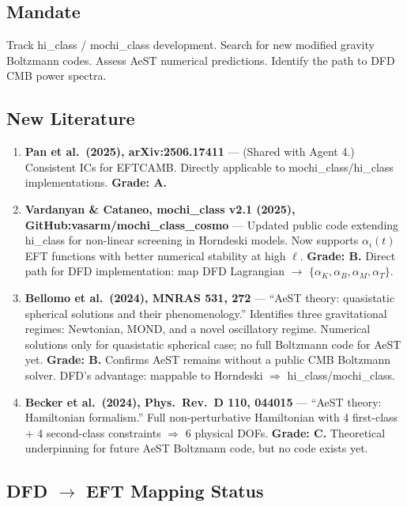 \documentclass[11pt,a4paper]{article}
\begin{document}
\subsection{Mandate}
Track hi\_class / mochi\_class development. Search for new modified gravity Boltzmann codes. Assess AeST numerical predictions. Identify the path to DFD CMB power spectra.

\subsection{New Literature}

\begin{enumerate}

\item \textbf{Pan et al.\ (2025), arXiv:2506.17411} --- (Shared with Agent 4.) Consistent ICs for EFTCAMB. Directly applicable to mochi\_class/hi\_class implementations. \textbf{Grade: A.}

\item \textbf{Vardanyan \& Cataneo, mochi\_class v2.1 (2025), GitHub:vasarm/mochi\_class\_cosmo} --- Updated public code extending hi\_class for non-linear screening in Horndeski models. Now supports $\alpha_i(t)$ EFT functions with better numerical stability at high $\ell$. \textbf{Grade: B.} Direct path for DFD implementation: map DFD Lagrangian $\to$ $\{\alpha_K, \alpha_B, \alpha_M, \alpha_T\}$.

\item \textbf{Bellomo et al.\ (2024), MNRAS 531, 272} --- ``AeST theory: quasistatic spherical solutions and their phenomenology.'' Identifies three gravitational regimes: Newtonian, MOND, and a novel oscillatory regime. Numerical solutions only for quasistatic spherical case; no full Boltzmann code for AeST yet. \textbf{Grade: B.} Confirms AeST remains without a public CMB Boltzmann solver. DFD's advantage: mappable to Horndeski $\Rightarrow$ hi\_class/mochi\_class.

\item \textbf{Becker et al.\ (2024), Phys.\ Rev.\ D 110, 044015} --- ``AeST theory: Hamiltonian formalism.'' Full non-perturbative Hamiltonian with 4 first-class + 4 second-class constraints $\Rightarrow$ 6 physical DOFs. \textbf{Grade: C.} Theoretical underpinning for future AeST Boltzmann code, but no code exists yet.

\end{enumerate}

\subsection{DFD $\to$ EFT Mapping Status}
\end{document}
